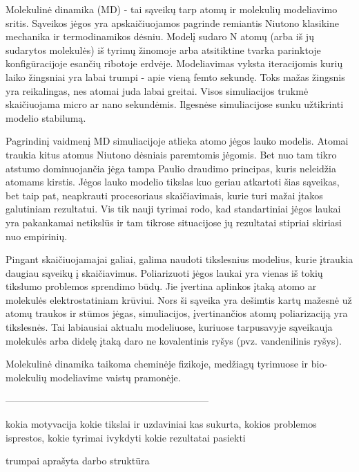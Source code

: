 Molekulinė dinamika (MD) - tai sąveikų tarp atomų ir molekulių modeliavimo sritis.
Sąveikos jėgos yra apskaičiuojamos pagrinde remiantis Niutono klasikine mechanika ir termodinamikos dėsniu.
Modelį sudaro N atomų (arba iš jų sudarytos molekulės) iš tyrimų žinomoje arba atsitiktine tvarka parinktoje konfigūracijoje esančių ribotoje erdvėje.
Modeliavimas vyksta iteracijomis kurių laiko žingsniai yra labai trumpi - apie vieną femto sekundę.
Toks mažas žingsnis yra reikalingas, nes atomai juda labai greitai.
Visos simuliacijos trukmė skaičiuojama micro ar nano sekundėmis.
Ilgesnėse simuliacijose sunku užtikrinti modelio stabilumą.

Pagrindinį vaidmenį MD simuliacijoje atlieka atomo jėgos lauko modelis.
Atomai traukia kitus atomus Niutono dėsniais paremtomis jėgomis.
Bet nuo tam tikro atstumo dominuojančia jėga tampa Paulio draudimo principas, kuris neleidžia atomams kirstis.
Jėgos lauko modelio tikslas kuo geriau atkartoti šias sąveikas, bet taip pat, neapkrauti procesoriaus skaičiavimais, kurie turi mažai įtakos galutiniam rezultatui.
Vis tik nauji tyrimai rodo, kad standartiniai jėgos laukai yra pakankamai netikslūs ir tam tikrose situacijose jų rezultatai stipriai skiriasi nuo empirinių.

Pingant skaičiuojamajai galiai, galima naudoti tikslesnius modelius, kurie įtraukia daugiau sąveikų į skaičiavimus.
Poliarizuoti jėgos laukai yra vienas iš tokių tikslumo problemos sprendimo būdų.
Jie įvertina aplinkos įtaką atomo ar molekulės elektrostatiniam krūviui.
Nors ši sąveika yra dešimtis kartų mažesnė už atomų traukos ir stūmos jėgas, simuliacijos, įvertinančios atomų poliarizaciją yra tikslesnės.
Tai labiausiai aktualu modeliuose, kuriuose tarpusavyje sąveikauja molekulės arba didelę įtaką daro ne kovalentinis ryšys (pvz. vandenilinis ryšys).

Molekulinė dinamika taikoma cheminėje fizikoje, medžiagų tyrimuose ir bio-molekulių modeliavime vaistų pramonėje.

---------------------------------------------------------------

kokia motyvacija
kokie tikslai ir uzdaviniai
kas sukurta, kokios problemos isprestos, kokie tyrimai ivykdyti
kokie rezultatai pasiekti

trumpai aprašyta darbo struktūra

